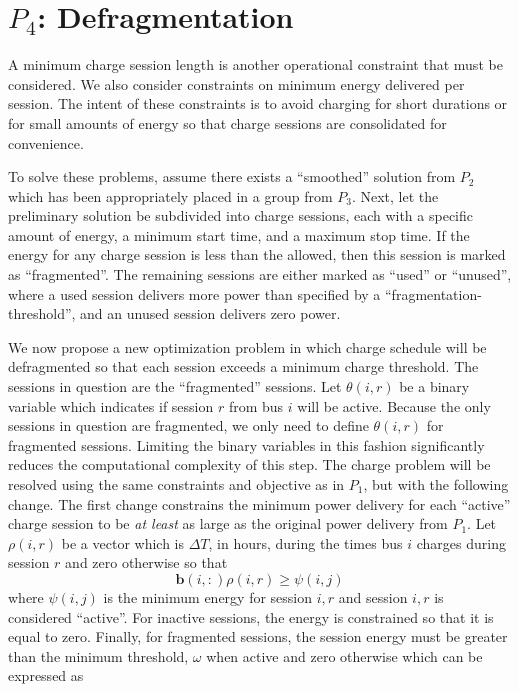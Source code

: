 \section{$P_4$: Defragmentation\label{sec:defragmentation}}
A minimum charge session length is another operational constraint that must be considered. We also consider constraints on minimum energy delivered per session. The intent of these constraints is to avoid charging for short durations or for small amounts of energy so that charge sessions are consolidated for convenience. 
\par To solve these problems, assume there exists a ``smoothed'' solution from $P_2$ which has been appropriately placed in a group from $P_3$. Next, let the preliminary solution be subdivided into charge sessions, each with a specific amount of energy, a minimum start time, and a maximum stop time. If the energy for any charge session is less than the allowed, then this session is marked as ``fragmented''.  The remaining sessions are either marked as ``used'' or ``unused'', where a used session delivers more power than specified by a ``fragmentation-threshold'', and an unused session delivers zero power. 
\par We now propose a new optimization problem in which charge schedule will be defragmented so that each session exceeds a minimum charge threshold. The sessions in question are the ``fragmented'' sessions.  Let $\theta(i,r)$ be a binary variable which indicates if session $r$ from bus $i$ will be active. Because the only sessions in question are fragmented, we only need to define $\theta(i,r)$ for fragmented sessions. Limiting the binary variables in this fashion significantly reduces the computational complexity of this step.  The charge problem will be resolved using the same constraints and objective as in $P_1$, but with the following change. The first change constrains the minimum power delivery for each ``active'' charge session to be {\it at least} as large as the original power delivery from $P_1$. Let $\rho(i,r)$ be a vector which is $\Delta T$, in hours, during the times bus $i$ charges during session $r$ and zero otherwise so that  
\begin{equation}\label{eqn:defragmentation:active}
	\mathbf{b}(i,:)\rho(i,r) \ge \psi(i,j)
\end{equation}
where $\psi(i,j)$ is the minimum energy for session $i,r$ and session $i,r$ is considered ``active''. For inactive sessions, the energy is constrained so that it is equal to zero. Finally, for fragmented sessions, the session energy must be greater than the minimum threshold, $\omega$ when active and zero otherwise which can be expressed as
